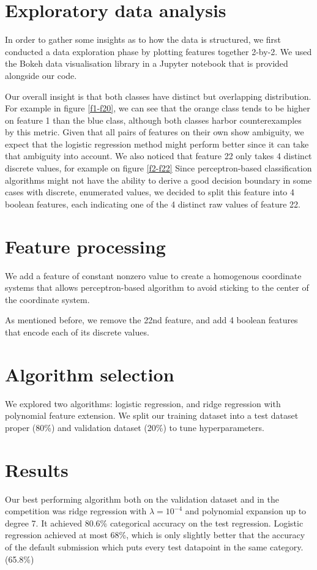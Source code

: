 \documentclass[10pt,conference,compsocconf]{IEEEtran}
\begin{document}
\section{Exploratory data analysis}
In order to gather some insights as to how the data is structured, we first conducted a data exploration phase by plotting features together 2-by-2.
We used the Bokeh data visualisation library in a Jupyter notebook that is provided alongside our code.

Our overall insight is that both classes have distinct but overlapping distribution. For example in figure \ref{f1-f20}, we can see that the orange class tends to be higher on feature 1 than the blue class, although both classes harbor counterexamples by this metric. Given that all pairs of features on their own show ambiguity, we expect that the logistic regression method might perform better since it can take that ambiguity into account. We also noticed that feature 22 only takes 4 distinct discrete values, for example on figure \ref{f2-f22} Since perceptron-based classification algorithms might not have the ability to derive a good decision boundary in some cases with discrete, enumerated values, we decided to split this feature into 4 boolean features, each indicating one of the 4 distinct raw values of feature 22.

\section{Feature processing}
We add a feature of constant nonzero value to create a homogenous coordinate systems that allows perceptron-based algorithm to avoid sticking to the center of the coordinate system.

As mentioned before, we remove the 22nd feature, and add 4 boolean features that encode each of its discrete values.

\section{Algorithm selection}
We explored two algorithms: logistic regression, and ridge regression with polynomial feature extension. We split our training dataset into a test dataset proper (80\%) and validation dataset (20\%) to tune hyperparameters.

\section{Results}
Our best performing algorithm both on the validation dataset and in the competition was ridge regression with $\lambda = 10^{-4}$ and polynomial expansion up to degree 7. It achieved 80.6\% categorical accuracy on the test regression. Logistic regression achieved at most 68\%, which is only slightly better that the accuracy of the default submission which puts every test datapoint in the same category. (65.8\%)
\end{document}
